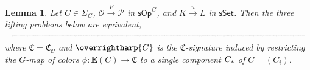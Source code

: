 \documentclass[a4paper,10pt
,draft
]{article}%
\numberwithin{equation}{section}
\numberwithin{figure}{section}
\newtheorem{lemma}[equation]{Lemma}%
\theoremstyle{definition} %
\newcommand{\set}[1]{\left\{#1\right\}}%
\newcommand{\vect}[1]{\text{\overrightharp{\ensuremath{#1}}}}
\newcommand{\Set}{\ensuremath{\mathsf{Set}}}
\newcommand{\sSet}{\ensuremath{\mathsf{sSet}}}%
\newcommand{\sOp}{\ensuremath{\mathsf{sOp}}}%
\DeclareMathOperator{\Hom}{Hom}%
\DeclareMathOperator{\Aut}{Aut}%
\renewcommand{\O}{\ensuremath{\mathcal O}}
\renewcommand{\P}{\ensuremath{\mathcal P}}
\newcommand{\1}{\ensuremath{\mathbbm 1}}%
\begin{document}
\begin{lemma}
      \label{OPTENS_LEM}
      Let $C \in \Sigma_G$, $\O \xrightarrow{F} \P$ in $\sOp^G$, and $K \xrightarrow{u} L$ in $\sSet$.
      Then the three lifting problems below are equivalent,
      \begin{equation}
            \resizebox{\textwidth}{!}{%
              \begin{tikzcd}[column sep = small, ampersand replacement = \&]
                    \Omega(C) \otimes_\Set K \arrow[r, "\phi"] \arrow[d, "u"']
                    \&
                    \O \arrow[d, "F"']
                    \& %
                    K \arrow[r] \arrow[d, "u"]
                    \&
                    \O(\vect C)^{\Aut_{G \ltimes \Sigma_{\mathfrak C}}(\vect C)} \arrow[d, "{F(\vect C)}"]
                    \& %
                    \partial \Omega(C) \arrow[r, "\phi"] \arrow[d]
                    \&
                    \set{L,\O}_\Set \arrow[d, "{u^{\**}, F_{\**}}"]
                    \\
                    \Omega(C) \otimes_\Set L \arrow[r] \arrow[ur, dashed]
                    \&
                    \P 
                    \& %
                    L \arrow[r] \arrow[ur, dashed]
                    \&
                    \P(F(\vect C))^{\Aut_{G \ltimes \Sigma_{\mathfrak C}}(\vect C)} 
                    \& %
                    \Omega(C) \arrow[r] \arrow[ur, dashed]
                    \&
                    \displaystyle{
                      \set{K,\O}_\Set \mathop{\times}\limits_{\set{K,\P}_\Set} \set{L,\P}_\Set
                    }
              \end{tikzcd}
            }
      \end{equation}
      where $\mathfrak C = \mathfrak C_\O$ and
      $\vect C$ is the $\mathfrak C$-signature induced by
      restricting the $G$-map of colors $\phi \colon \boldsymbol{E}(C) \to \mathfrak C$
      to a single component $C_{\**}$ of $C = (C_i)$. 
\end{lemma}
\end{document}
